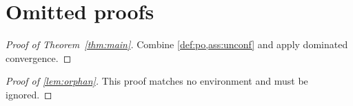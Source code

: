 \section{Omitted proofs}

\begin{proof}[Proof of Theorem~\ref{thm:main}]
Combine \cref{def:po,ass:unconf} and apply dominated convergence.
\end{proof}

\begin{proof}[Proof of \cref{lem:orphan}]
This proof matches no environment and must be ignored.
\end{proof}
